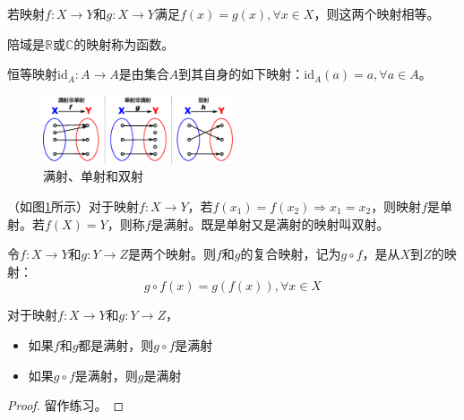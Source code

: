 \documentclass[main.tex]{subfiles}
\begin{document}
\begin{definition}[映射的相等]
若映射$f:X\rightarrow Y$和$g:X\rightarrow Y$满足$f\left(x\right)=g\left(x\right),\forall x\in X$，则这两个映射相等。
\end{definition}

\begin{definition}[函数]
陪域是$\mathbb{R}$或$\mathbb{C}$的映射称为函数。
\end{definition}

\begin{definition}[恒等映射]
恒等映射$\mathrm{id}_A:A\rightarrow A$是由集合$A$到其自身的如下映射：$\mathrm{id}_A\left(a\right)=a,\forall a\in A$。
\end{definition}

\begin{figure}[htbp]
\centering
\includegraphics[width=0.5\textwidth]{images/II.1.2.eps}
\caption{满射、单射和双射}
\label{fig:II.1.2}
\end{figure}

\begin{definition}[单射、双射、满射]
（如图\ref{fig:II.1.2}所示）对于映射$f:X\rightarrow Y$，若$f\left(x_1\right)=f\left(x_2\right)\Rightarrow x_1=x_2$，则映射$f$是单射。若$f\left(X\right)=Y$，则称$f$是满射。既是单射又是满射的映射叫双射。
\end{definition}

\begin{definition}[复合映射]
令$f:X\rightarrow Y$和$g:Y\rightarrow Z$是两个映射。则$f$和$g$的复合映射，记为$g\circ f$，是从$X$到$Z$的映射：
\[g\circ f\left(x\right)=g\left(f\left(x\right)\right),\forall x\in X\]
\end{definition}

\begin{theorem}
对于映射$f:X\rightarrow Y$和$g: Y\rightarrow Z$，
\begin{itemize}
    \item 如果$f$和$g$都是满射，则$g\circ f$是满射
    \item 如果$g\circ f$是满射，则$g$是满射
\end{itemize}
\end{theorem}
\begin{proof}
留作练习。
\end{proof}
\end{document}
